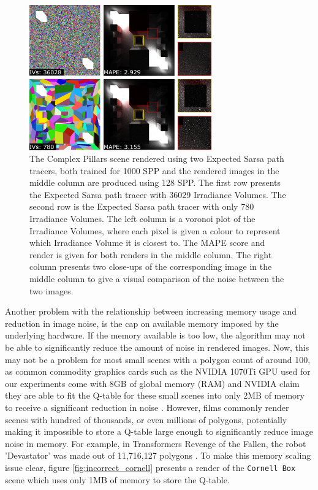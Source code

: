 \documentclass[../dissertation.tex]{subfiles}
\begin{document}
\begin{figure}[h]
\centering
\includegraphics[width=0.7\textwidth]{images/less_volumes.png}   
\caption{The Complex Pillars scene rendered using two Expected Sarsa path tracers, both trained for 1000 SPP and the rendered images in the middle column are produced using 128 SPP. The first row presents the Expected Sarsa path tracer with 36029 Irradiance Volumes. The second row is the Expected Sarsa path tracer with only 780 Irradiance Volumes. The left column is a voronoi plot of the Irradiance Volumes, where each pixel is given a colour to represent which Irradiance Volume it is closest to. The MAPE score and render is given for both renders in the middle column. The right column presents two close-ups of the corresponding image in the middle column to give a visual comparison of the noise between the two images.}
\label{fig:voronoi_difference}
\end{figure}

Another problem with the relationship between increasing memory usage and reduction in image noise, is the cap on available memory imposed by the underlying hardware. If the memory available is too low, the algorithm may not be able to significantly reduce the amount of noise in rendered images. Now, this may not be a problem for most small scenes with a polygon count of around 100, as common commodity graphics cards such as the NVIDIA 1070Ti GPU used for our experiments come with 8GB of global memory (RAM) and NVIDIA claim they are able to fit the Q-table for these small scenes into only 2MB of memory to receive a significant reduction in noise \cite{dahm2017learning}. However, films commonly render scenes with hundred of thousands, or even millions of polygons, potentially making it impossible to store a Q-table large enough to significantly reduce image noise in memory. For example, in Transformers Revenge of the Fallen, the robot 'Devastator' was made out of 11,716,127 polygons \cite{devastator}. To make this  memory scaling issue clear, figure \ref{fig:incorrect_cornell} presents a render of the \verb|Cornell Box| scene which uses only 1MB of memory to store the Q-table.
\end{document}

